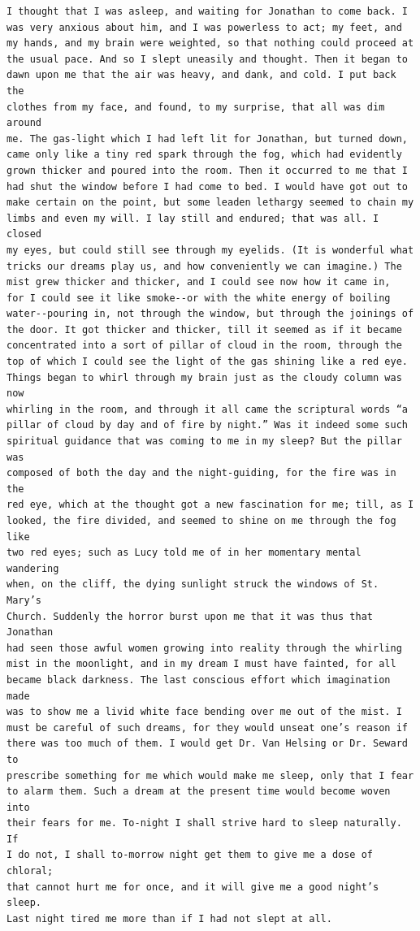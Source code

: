 \documentclass{article}
\begin{document}
\begin{verbatim}
I thought that I was asleep, and waiting for Jonathan to come back. I
was very anxious about him, and I was powerless to act; my feet, and
my hands, and my brain were weighted, so that nothing could proceed at
the usual pace. And so I slept uneasily and thought. Then it began to
dawn upon me that the air was heavy, and dank, and cold. I put back the
clothes from my face, and found, to my surprise, that all was dim around
me. The gas-light which I had left lit for Jonathan, but turned down,
came only like a tiny red spark through the fog, which had evidently
grown thicker and poured into the room. Then it occurred to me that I
had shut the window before I had come to bed. I would have got out to
make certain on the point, but some leaden lethargy seemed to chain my
limbs and even my will. I lay still and endured; that was all. I closed
my eyes, but could still see through my eyelids. (It is wonderful what
tricks our dreams play us, and how conveniently we can imagine.) The
mist grew thicker and thicker, and I could see now how it came in,
for I could see it like smoke--or with the white energy of boiling
water--pouring in, not through the window, but through the joinings of
the door. It got thicker and thicker, till it seemed as if it became
concentrated into a sort of pillar of cloud in the room, through the
top of which I could see the light of the gas shining like a red eye.
Things began to whirl through my brain just as the cloudy column was now
whirling in the room, and through it all came the scriptural words “a
pillar of cloud by day and of fire by night.” Was it indeed some such
spiritual guidance that was coming to me in my sleep? But the pillar was
composed of both the day and the night-guiding, for the fire was in the
red eye, which at the thought got a new fascination for me; till, as I
looked, the fire divided, and seemed to shine on me through the fog like
two red eyes; such as Lucy told me of in her momentary mental wandering
when, on the cliff, the dying sunlight struck the windows of St. Mary’s
Church. Suddenly the horror burst upon me that it was thus that Jonathan
had seen those awful women growing into reality through the whirling
mist in the moonlight, and in my dream I must have fainted, for all
became black darkness. The last conscious effort which imagination made
was to show me a livid white face bending over me out of the mist. I
must be careful of such dreams, for they would unseat one’s reason if
there was too much of them. I would get Dr. Van Helsing or Dr. Seward to
prescribe something for me which would make me sleep, only that I fear
to alarm them. Such a dream at the present time would become woven into
their fears for me. To-night I shall strive hard to sleep naturally. If
I do not, I shall to-morrow night get them to give me a dose of chloral;
that cannot hurt me for once, and it will give me a good night’s sleep.
Last night tired me more than if I had not slept at all.


\end{verbatim}
\end{document}

